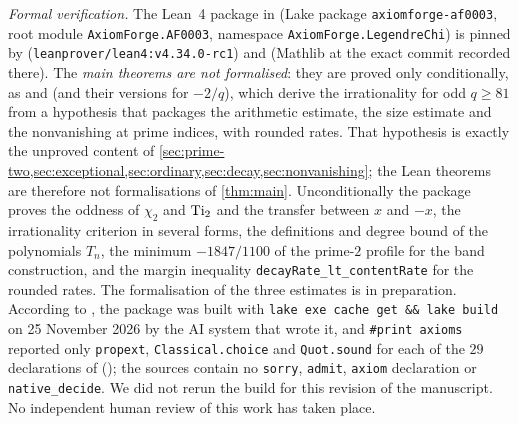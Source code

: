 \emph{Formal verification.} The Lean~4 package in  (Lake package
\texttt{axiomforge-af0003}, root module \texttt{AxiomForge.AF0003}, namespace
\texttt{AxiomForge.LegendreChi}) is pinned by 
(\texttt{leanprover/lean4:v4.34.0-rc1}) and  (Mathlib at the exact commit
recorded there). The \emph{main theorems are not formalised}: they are proved only conditionally,
as  and
 (and
their versions for $-2/q$), which derive the irrationality for odd $q\ge81$ from a hypothesis that
packages the arithmetic estimate, the size estimate and the nonvanishing at prime indices, with
rounded rates. That hypothesis is exactly the unproved content of
\cref{sec:prime-two,sec:exceptional,sec:ordinary,sec:decay,sec:nonvanishing}; the Lean theorems
are therefore not formalisations of \cref{thm:main}. Unconditionally the package proves the
oddness of $\chi_2$ and $\operatorname{Ti}_2$ and the transfer between $x$ and $-x$, the irrationality
criterion in several forms, the definitions and degree bound of the polynomials $T_n$, the minimum
$-1847/1100$ of the prime-$2$ profile for the band construction, and the margin inequality
\texttt{decayRate\_lt\_contentRate} for the rounded rates. The formalisation of the three
estimates is in preparation. According to , the package was built with
\texttt{lake exe cache get \&\& lake build} on 25 November 2026 by the AI system that wrote it,
and \texttt{\#print axioms} reported only \texttt{propext}, \texttt{Classical.choice} and
\texttt{Quot.sound} for each of the $29$ declarations of 
(); the sources contain no \texttt{sorry}, \texttt{admit}, \texttt{axiom}
declaration or \texttt{native\_decide}. We did not rerun the build for this revision of the
manuscript. No independent human review of this work has taken place.
